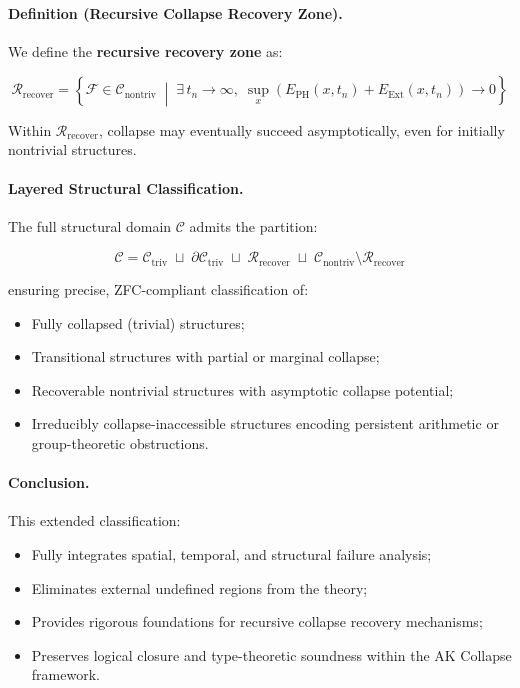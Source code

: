 \documentclass[11pt]{article}
\begin{document}
\paragraph{Definition (Recursive Collapse Recovery Zone).}

We define the \textbf{recursive recovery zone} as:

\[
\mathcal{R}_{\mathrm{recover}} = \left\{ \mathcal{F} \in \mathcal{C}_{\mathrm{nontriv}} \;\middle|\; \exists \, t_n \to \infty, \; \sup_{x} \left( E_{\mathrm{PH}}(x,t_n) + E_{\mathrm{Ext}}(x,t_n) \right) \to 0 \right\}
\]

Within $\mathcal{R}_{\mathrm{recover}}$, collapse may eventually succeed asymptotically, even for initially nontrivial structures.

\paragraph{Layered Structural Classification.}

The full structural domain $\mathcal{C}$ admits the partition:

\[
\mathcal{C} = \mathcal{C}_{\mathrm{triv}} \;\sqcup\; \partial \mathcal{C}_{\mathrm{triv}} \;\sqcup\; \mathcal{R}_{\mathrm{recover}} \;\sqcup\; \mathcal{C}_{\mathrm{nontriv}} \setminus \mathcal{R}_{\mathrm{recover}}
\]

ensuring precise, ZFC-compliant classification of:

\begin{itemize}
    \item Fully collapsed (trivial) structures;
    \item Transitional structures with partial or marginal collapse;
    \item Recoverable nontrivial structures with asymptotic collapse potential;
    \item Irreducibly collapse-inaccessible structures encoding persistent arithmetic or group-theoretic obstructions.
\end{itemize}

\paragraph{Conclusion.}

This extended classification:

\begin{itemize}
    \item Fully integrates spatial, temporal, and structural failure analysis;
    \item Eliminates external undefined regions from the theory;
    \item Provides rigorous foundations for recursive collapse recovery mechanisms;
    \item Preserves logical closure and type-theoretic soundness within the AK Collapse framework.
\end{itemize}
\end{document}
